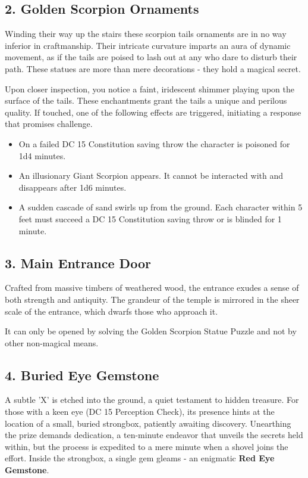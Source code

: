 \subsection*{2. Golden Scorpion Ornaments}
{\entryfont
	Winding their way up the stairs these scorpion tails ornaments are in no way inferior in craftmanship. Their intricate curvature imparts an aura of dynamic movement, as if the tails are poised to lash out at any who dare to disturb their path. These statues are more than mere decorations - they hold a magical secret.
	
	Upon closer inspection, you notice a faint, iridescent shimmer playing upon the surface of the tails. These enchantments grant the tails a unique and perilous quality. If touched, one of the following effects are triggered, initiating a response that promises challenge.
	\clearpage
	\begin{itemize}
		\item On a failed DC 15 Constitution saving throw the character is poisoned for 1d4 minutes.
		\item An illusionary Giant Scorpion appears. It cannot be interacted with and disappears after 1d6 minutes.
		\item A sudden cascade of sand swirls up from the ground. Each character within 5 feet must succeed a DC 15 Constitution saving throw or is blinded for 1 minute.
	\end{itemize}
}

\subsection*{3. Main Entrance Door}
{\entryfont
	Crafted from massive timbers of weathered wood, the entrance exudes a sense of both strength and antiquity. The grandeur of the temple is mirrored in the sheer scale of the entrance, which dwarfs those who approach it.
	
	It can only be opened by solving the Golden Scorpion Statue Puzzle and not by other non-magical means.
}

\subsection*{4. Buried Eye Gemstone}
{\entryfont
	A subtle 'X' is etched into the ground, a quiet testament to hidden treasure. For those with a keen eye (DC 15 Perception Check), its presence hints at the location of a small, buried strongbox, patiently awaiting discovery. Unearthing the prize demands dedication, a ten-minute endeavor that unveils the secrets held within, but the process is expedited to a mere minute when a shovel joins the effort. Inside the strongbox, a single gem gleams - an enigmatic \textbf{Red Eye Gemstone}.
}

